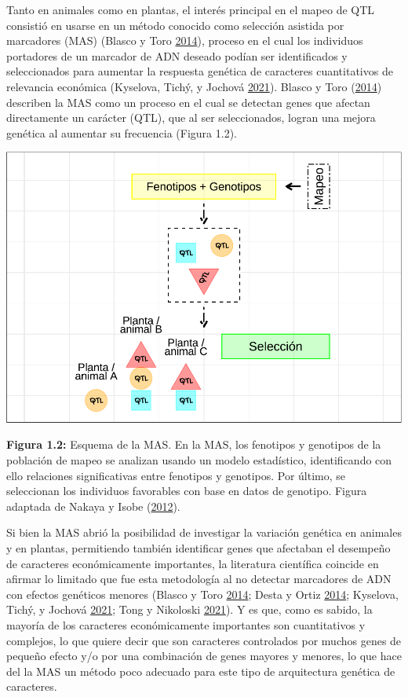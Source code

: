 \documentclass[11pt,spanish,a4paper,oneside,]{book} %
\begin{document}
Tanto en animales como en plantas, el interés principal en el mapeo de QTL consistió en usarse en un método conocido como selección asistida por marcadores (MAS) (Blasco y Toro \protect\hyperlink{ref-cite:3}{2014}), proceso en el cual los individuos portadores de un marcador de ADN deseado podían ser identificados y seleccionados para aumentar la respuesta genética de caracteres cuantitativos de relevancia económica (Kyselova, Tichý, y Jochová \protect\hyperlink{ref-cite:32}{2021}). Blasco y Toro (\protect\hyperlink{ref-cite:3}{2014}) describen la MAS como un proceso en el cual se detectan genes que afectan directamente un carácter (QTL), que al ser seleccionados, logran una mejora genética al aumentar su frecuencia (Figura 1.2).

\begin{center}\includegraphics[width=1\linewidth]{figures/MAS} \end{center}

\begin{center}
\textbf{Figura 1.2:} Esquema de la MAS. En la MAS, los fenotipos y genotipos de la población de mapeo se analizan usando un modelo estadístico, identificando con ello relaciones significativas entre fenotipos y genotipos. Por último, se seleccionan los individuos favorables con base en datos de genotipo. Figura adaptada de Nakaya y Isobe (\protect\hyperlink{ref-cite:6}{2012}).

\end{center}

Si bien la MAS abrió la posibilidad de investigar la variación genética en animales y en plantas, permitiendo también identificar genes que afectaban el desempeño de caracteres económicamente importantes, la literatura científica coincide en afirmar lo limitado que fue esta metodología al no detectar marcadores de ADN con efectos genéticos menores (Blasco y Toro \protect\hyperlink{ref-cite:3}{2014}; Desta y Ortiz \protect\hyperlink{ref-cite:10}{2014}; Kyselova, Tichý, y Jochová \protect\hyperlink{ref-cite:32}{2021}; Tong y Nikoloski \protect\hyperlink{ref-cite:7}{2021}). Y es que, como es sabido, la mayoría de los caracteres económicamente importantes son cuantitativos y complejos, lo que quiere decir que son caracteres controlados por muchos genes de pequeño efecto y/o por una combinación de genes mayores y menores, lo que hace del la MAS un método poco adecuado para este tipo de arquitectura genética de caracteres.
\end{document}

